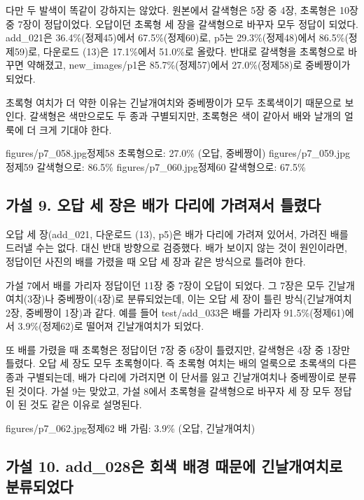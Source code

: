 \documentclass[11pt]{article}
\begin{document}
다만 두 발색이 똑같이 강하지는 않았다. 원본에서 갈색형은 5장 중 4장, 초록형은 10장 중 7장이 정답이었다. 오답이던 초록형 세 장을 갈색형으로 바꾸자 모두 정답이 되었다. add\_021은 36.4\%(정제45)에서 67.5\%(정제60)로, p5는 29.3\%(정제48)에서 86.5\%(정제59)로, 다운로드 (13)은 17.1\%에서 51.0\%로 올랐다. 반대로 갈색형을 초록형으로 바꾸면 약해졌고, new\_images/p1은 85.7\%(정제57)에서 27.0\%(정제58)로 중베짱이가 되었다.

초록형 여치가 더 약한 이유는 긴날개여치와 중베짱이가 모두 초록색이기 때문으로 보인다. 갈색형은 색만으로도 두 종과 구별되지만, 초록형은 색이 같아서 배와 날개의 얼룩에 더 크게 기대야 한다.

           {figures/p7_058.jpg}{정제58 초록형으로: 27.0\% (오답, 중베짱이)}
           {figures/p7_059.jpg}{정제59 갈색형으로: 86.5\%}
           {figures/p7_060.jpg}{정제60 갈색형으로: 67.5\%}

\subsection*{가설 9. 오답 세 장은 배가 다리에 가려져서 틀렸다}

오답 세 장(add\_021, 다운로드 (13), p5)은 배가 다리에 가려져 있어서, 가려진 배를 드러낼 수는 없다. 대신 반대 방향으로 검증했다. 배가 보이지 않는 것이 원인이라면, 정답이던 사진의 배를 가렸을 때 오답 세 장과 같은 방식으로 틀려야 한다.

가설 7에서 배를 가리자 정답이던 11장 중 7장이 오답이 되었다. 그 7장은 모두 긴날개여치(3장)나 중베짱이(4장)로 분류되었는데, 이는 오답 세 장이 틀린 방식(긴날개여치 2장, 중베짱이 1장)과 같다. 예를 들어 test/add\_033은 배를 가리자 91.5\%(정제61)에서 3.9\%(정제62)로 떨어져 긴날개여치가 되었다.

또 배를 가렸을 때 초록형은 정답이던 7장 중 6장이 틀렸지만, 갈색형은 4장 중 1장만 틀렸다. 오답 세 장도 모두 초록형이다. 즉 초록형 여치는 배의 얼룩으로 초록색의 다른 종과 구별되는데, 배가 다리에 가려지면 이 단서를 잃고 긴날개여치나 중베짱이로 분류된 것이다. 가설 9는 맞았고, 가설 8에서 초록형을 갈색형으로 바꾸자 세 장 모두 정답이 된 것도 같은 이유로 설명된다.

           {figures/p7_062.jpg}{정제62 배 가림: 3.9\% (오답, 긴날개여치)}

\subsection*{가설 10. add\_028은 회색 배경 때문에 긴날개여치로 분류되었다}
\end{document}
